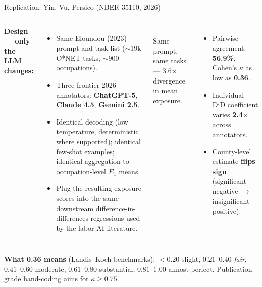 \begin{frame}{Replication: Yin, Vu, Persico (NBER 35110, 2026)}
\begin{columns}[T]
\textbf{Design --- only the LLM changes:}
\begin{itemize}
\item Same Eloundou (2023) prompt and task list ($\sim$19k O*NET tasks, $\sim$900 occupations).
\item Three frontier 2026 annotators: \textbf{ChatGPT-5}, \textbf{Claude 4.5}, \textbf{Gemini 2.5}.
\item Identical decoding (low temperature, deterministic where supported); identical few-shot examples; identical aggregation to occupation-level $E_1$ means.
\item Plug the resulting exposure scores into the same downstream difference-in-differences regressions used by the labor-AI literature.
\end{itemize}

\begin{center}
\\
{\footnotesize Same prompt, same tasks --- 3.6$\times$ divergence in mean exposure.}
\end{center}

\smallskip
\begin{itemize}
\item \scriptsize Pairwise agreement: \textbf{56.9\%}, Cohen's $\kappa$ as low as \textbf{0.36}.
\item \scriptsize Individual DiD coefficient varies \textbf{2.4$\times$} across annotators.
\item \scriptsize County-level estimate \textbf{flips sign} (significant negative $\to$ insignificant positive).
\end{itemize}
\end{columns}

\smallskip
\textbf{What 0.36 means} (Landis--Koch benchmarks): $<\!0.20$ slight, $0.21$--$0.40$ \emph{fair}, $0.41$--$0.60$ moderate, $0.61$--$0.80$ substantial, $0.81$--$1.00$ almost perfect. Publication-grade hand-coding aims for $\kappa \ge 0.75$.
\end{frame}

